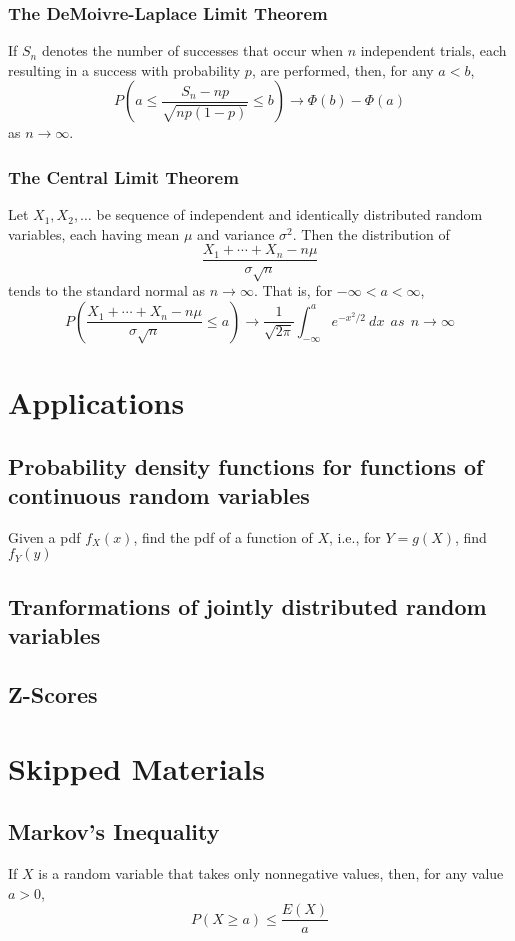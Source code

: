 \documentclass{amsproc}
\begin{document}
			\subsubsection{The DeMoivre-Laplace Limit Theorem} If $S_{n}$ denotes the number of successes that occur when $n$ independent trials, each resulting in a success with probability $p$, are performed, then, for any $a < b$, \[P\left(a \leq \frac{S_{n} - np}{\sqrt{np(1-p)}} \leq b \right) \rightarrow \Phi(b) - \Phi(a)\] as $n \rightarrow \infty$.

			\subsubsection{The Central Limit Theorem} Let $X_{1}, X_{2}, \dots$ be sequence of independent and identically distributed random variables, each having mean $\mu$ and variance $\sigma^{2}$. Then the distribution of \[\frac{X_{1} + \cdots + X_{n} - n\mu}{\sigma \sqrt{n}}\] tends to the standard normal as $n \rightarrow \infty$. That is, for $-\infty < a < \infty$, \[P\left(\frac{X_{1} + \cdots + X_{n} - n\mu}{\sigma \sqrt{n}} \leq a\right) \rightarrow \frac{1}{\sqrt{2\pi}}\int_{-\infty}^{a} e^{-x^{2}/2} \ dx \ \ as \ \ n \rightarrow \infty \]

	\section{Applications}
		\subsection{Probability density functions for functions of continuous random variables} 
		Given a pdf $f_{X}(x)$, find the pdf of a function of $X$, i.e., for $Y = g(X)$, find $f_{Y}(y)$

		\subsection{Tranformations of jointly distributed random variables}

		\subsection{Z-Scores}

	\section{Skipped Materials}
		\subsection{Markov's Inequality} If $X$ is a random variable that takes only nonnegative values, then, for any value $a > 0$, \[P(X \geq a) \leq \frac{E(X)}{a}\]
\end{document}
